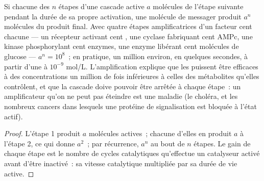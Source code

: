 \begin{theorem}\label{thm:b2:cell-signalling:amplification}
Si chacune des $n$ étapes d'une cascade active $a$ molécules de l'étape
suivante pendant la durée de sa propre activation, une molécule de
messager produit $a^{n}$ molécules du produit final. Avec quatre étapes
amplificatrices d'un facteur cent chacune --- un récepteur activant cent
, une cyclase fabriquant cent AMPc, une kinase phosphorylant
cent enzymes, une enzyme libérant cent molécules de glucose ---
$a^{n} = 10^{8}$~; en pratique, un million environ, en quelques
secondes, à partir d'une  à $10^{-9}$ mol/L. L'amplification
explique que les  puissent être efficaces à des concentrations
un million de fois inférieures à celles des métabolites qu'elles
contrôlent, et que la cascade doive pouvoir être arrêtée à chaque étape~:
un amplificateur qu'on ne peut pas éteindre est une maladie (le choléra,
et les nombreux cancers dans lesquels une protéine de signalisation est
bloquée à l'état actif).
\end{theorem}
\begin{proof}
L'étape 1 produit $a$ molécules actives~; chacune d'elles en produit $a$
à l'étape 2, ce qui donne $a^{2}$~; par récurrence, $a^{n}$ au bout de
$n$ étapes. Le gain de chaque étape est le nombre de cycles catalytiques
qu'effectue un catalyseur activé avant d'être inactivé~: sa vitesse
catalytique multipliée par sa durée de vie active.
\end{proof}

